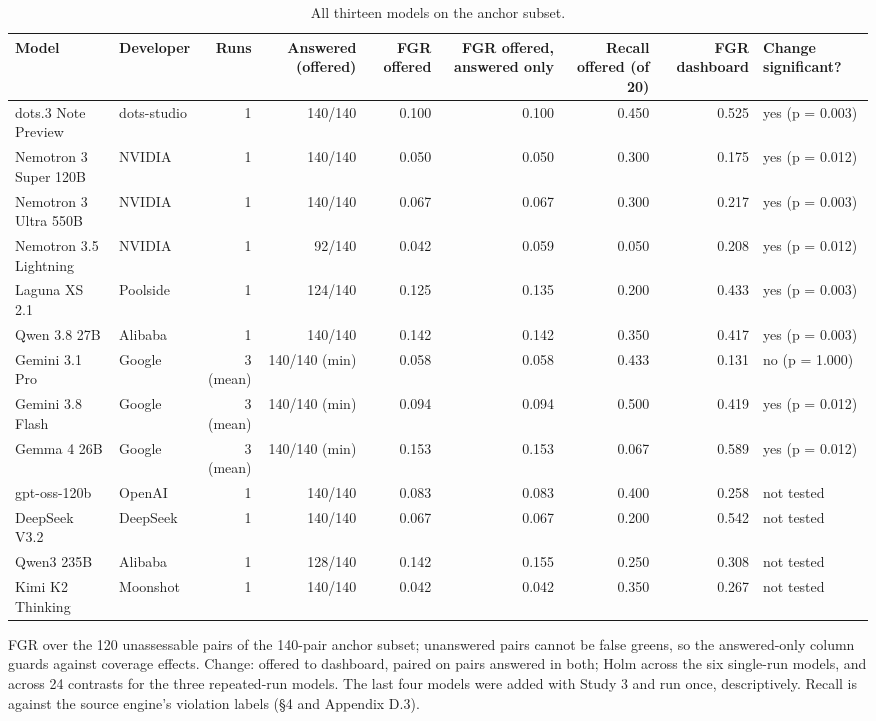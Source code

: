 \documentclass[10pt,twocolumn]{article}
\begin{document}
\begin{table}[t]
\centering\footnotesize\setlength{\tabcolsep}{4pt}
\caption{All thirteen models on the anchor subset.}
\label{tab:15}
\begin{adjustbox}{max width=\textwidth}
\begin{tabular}{llrrrrrrl}
\toprule
\textbf{Model} & \textbf{Developer} & \textbf{Runs} & \textbf{Answered (offered)} & \textbf{FGR offered} & \textbf{FGR offered, answered only} & \textbf{Recall offered (of 20)} & \textbf{FGR dashboard} & \textbf{Change significant?} \\
\midrule
dots.3 Note Preview & dots-studio & 1 & 140/140 & 0.100 & 0.100 & 0.450 & 0.525 & yes (p = 0.003) \\
Nemotron 3 Super 120B & NVIDIA & 1 & 140/140 & 0.050 & 0.050 & 0.300 & 0.175 & yes (p = 0.012) \\
Nemotron 3 Ultra 550B & NVIDIA & 1 & 140/140 & 0.067 & 0.067 & 0.300 & 0.217 & yes (p = 0.003) \\
Nemotron 3.5 Lightning & NVIDIA & 1 & 92/140 & 0.042 & 0.059 & 0.050 & 0.208 & yes (p = 0.012) \\
Laguna XS 2.1 & Poolside & 1 & 124/140 & 0.125 & 0.135 & 0.200 & 0.433 & yes (p = 0.003) \\
Qwen 3.8 27B & Alibaba & 1 & 140/140 & 0.142 & 0.142 & 0.350 & 0.417 & yes (p = 0.003) \\
Gemini 3.1 Pro & Google & 3 (mean) & 140/140 (min) & 0.058 & 0.058 & 0.433 & 0.131 & no (p = 1.000) \\
Gemini 3.8 Flash & Google & 3 (mean) & 140/140 (min) & 0.094 & 0.094 & 0.500 & 0.419 & yes (p = 0.012) \\
Gemma 4 26B & Google & 3 (mean) & 140/140 (min) & 0.153 & 0.153 & 0.067 & 0.589 & yes (p = 0.012) \\
gpt-oss-120b & OpenAI & 1 & 140/140 & 0.083 & 0.083 & 0.400 & 0.258 & not tested \\
DeepSeek V3.2 & DeepSeek & 1 & 140/140 & 0.067 & 0.067 & 0.200 & 0.542 & not tested \\
Qwen3 235B & Alibaba & 1 & 128/140 & 0.142 & 0.155 & 0.250 & 0.308 & not tested \\
Kimi K2 Thinking & Moonshot & 1 & 140/140 & 0.042 & 0.042 & 0.350 & 0.267 & not tested \\
\bottomrule
\end{tabular}
\end{adjustbox}
\par\vspace{3pt}\begin{minipage}{\textwidth}\scriptsize FGR over the 120 unassessable pairs of the 140-pair anchor subset; unanswered pairs cannot be false greens, so the answered-only column guards against coverage effects. Change: offered to dashboard, paired on pairs answered in both; Holm across the six single-run models, and across 24 contrasts for the three repeated-run models. The last four models were added with Study 3 and run once, descriptively. Recall is against the source engine's violation labels (§4 and Appendix D.3).\end{minipage}
\end{table}
\end{document}
